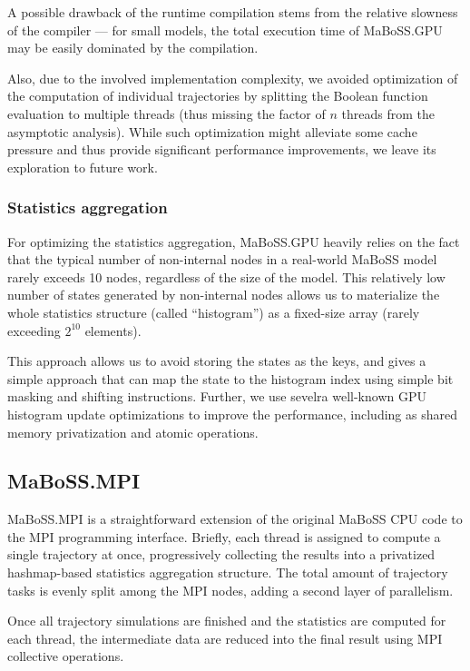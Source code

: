 \documentclass[a4paper,num-refs]{oup-contemporary}
\begin{document}
A possible drawback of the runtime compilation stems from the relative slowness of the compiler --- for small models, the total execution time of MaBoSS.GPU may be easily dominated by the compilation.

Also, due to the involved implementation complexity, we avoided optimization of the computation of individual trajectories by splitting the Boolean function evaluation to multiple threads (thus missing the factor of $n$ threads from the asymptotic analysis). While such optimization might alleviate some cache pressure and thus provide significant performance improvements, we leave its exploration to future work.

\subsubsection{Statistics aggregation}

For optimizing the statistics aggregation, MaBoSS.GPU heavily relies on the fact that the typical number of non-internal nodes in a real-world MaBoSS model rarely exceeds 10 nodes, regardless of the size of the model. This relatively low number of states generated by non-internal nodes allows us to materialize the whole statistics structure (called ``histogram'') as a fixed-size array (rarely exceeding $2^10$ elements).

This approach allows us to avoid storing the states as the keys, and gives a simple approach that can map the state to the histogram index using simple bit masking and shifting instructions. Further, we use sevelra well-known GPU histogram update optimizations to improve the performance, including as shared memory privatization and atomic operations.

\subsection{MaBoSS.MPI}

MaBoSS.MPI is a straightforward extension of the original MaBoSS CPU code to the MPI programming interface.
Briefly, each thread is assigned to compute a single trajectory at once, progressively collecting the results into a privatized hashmap-based statistics aggregation structure. The total amount of trajectory tasks is evenly split among the MPI nodes, adding a second layer of parallelism.

Once all trajectory simulations are finished and the statistics are computed for each thread, the intermediate data are reduced into the final result using MPI collective operations.
\end{document}
